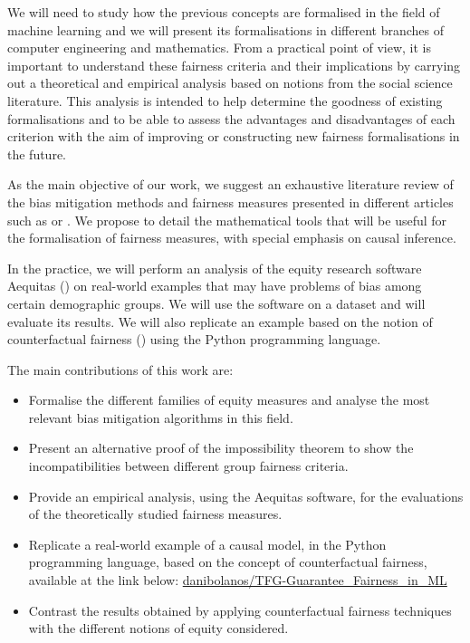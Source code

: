 We will need to study how the previous concepts are formalised in the field of machine learning and we will present its formalisations in different branches of computer engineering and mathematics. From a practical point of view, it is important to understand these fairness criteria and their implications by carrying out a theoretical and empirical analysis based on notions from the social science literature. This analysis is intended to help determine the goodness of existing formalisations and to be able to assess the advantages and disadvantages of each criterion with the aim of improving or constructing new fairness formalisations in the future. 

As the main objective of our work, we suggest an exhaustive literature review of the bias mitigation methods and fairness measures presented in different articles such as \cite{formalizing2018} or \cite{definitions2018}. We propose to detail the mathematical tools that will be useful for the formalisation of fairness measures, with special emphasis on causal inference.

In the practice, we will perform an analysis of the equity research software Aequitas (\cite{aequitas2019}) on real-world examples that may have problems of bias among certain demographic groups. We will use the software on a dataset and will evaluate its results. We will also replicate an example based on the notion of counterfactual fairness (\cite{counterfactual2018}) using the Python programming language.

The main contributions of this work are:

\begin{itemize}
    \item Formalise the different families of equity measures and analyse the most relevant bias mitigation algorithms in this field.
    \item Present an alternative proof of the impossibility theorem to show the incompatibilities between different group fairness criteria.
    \item Provide an empirical analysis, using the Aequitas software, for the evaluations of the theoretically studied fairness measures.
    \item Replicate a real-world example of a causal model, in the Python programming language, based on the concept of counterfactual fairness, available at the link below: \href{https://github.com/danibolanos/TFG-Guarantee_Fairness_in_ML.git}{danibolanos/TFG-Guarantee\_Fairness\_in\_ML}
    \item Contrast the results obtained by applying counterfactual fairness techniques with the different notions of equity considered.
\end{itemize}

